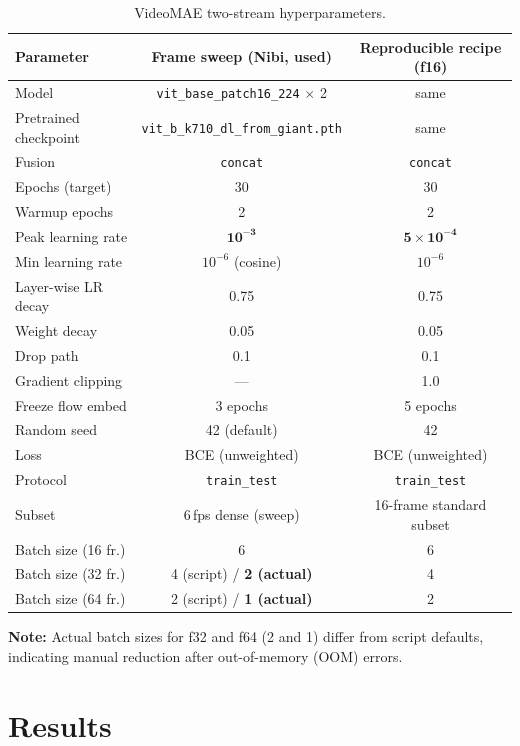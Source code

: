 \documentclass[11pt,a4paper]{article}
\begin{document}
\begin{table}[h]
\centering
\caption{VideoMAE two-stream hyperparameters.}
\label{tab:vmae-hparams}
\small
\begin{tabular}{@{}lcc@{}}
\toprule
Parameter & Frame sweep (Nibi, used) & Reproducible recipe (f16) \\
\midrule
Model & \texttt{vit\_base\_patch16\_224} $\times$ 2 & same \\
Pretrained checkpoint & \texttt{vit\_b\_k710\_dl\_from\_giant.pth} & same \\
Fusion & \texttt{concat} & \texttt{concat} \\
Epochs (target) & 30 & 30 \\
Warmup epochs & 2 & 2 \\
Peak learning rate & $\mathbf{10^{-3}}$ & $\mathbf{5 \times 10^{-4}}$ \\
Min learning rate & $10^{-6}$ (cosine) & $10^{-6}$ \\
Layer-wise LR decay & 0.75 & 0.75 \\
Weight decay & 0.05 & 0.05 \\
Drop path & 0.1 & 0.1 \\
Gradient clipping & --- & 1.0 \\
Freeze flow embed & 3 epochs & 5 epochs \\
Random seed & 42 (default) & 42 \\
Loss & BCE (unweighted) & BCE (unweighted) \\
Protocol & \texttt{train\_test} & \texttt{train\_test} \\
Subset & 6\,fps dense (sweep) & 16-frame standard subset \\
\midrule
Batch size (16 fr.) & 6 & 6 \\
Batch size (32 fr.) & 4 (script) / \textbf{2 (actual)} & 4 \\
Batch size (64 fr.) & 2 (script) / \textbf{1 (actual)} & 2 \\
\bottomrule
\end{tabular}
\end{table}

\noindent
\textbf{Note:} Actual batch sizes for f32 and f64 (2 and 1) differ from script defaults,
indicating manual reduction after out-of-memory (OOM) errors.

\section{Results}
\end{document}
